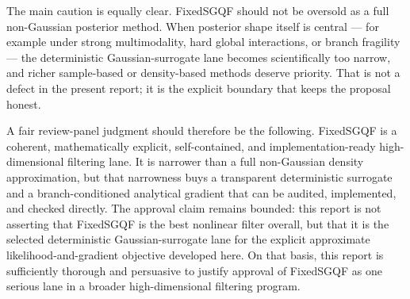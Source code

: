 \documentclass[11pt]{article}
\numberwithin{equation}{section}
\begin{document}
The main caution is equally clear.  FixedSGQF should not be oversold as a full
non-Gaussian posterior method.  When posterior shape itself is central --- for
example under strong multimodality, hard global interactions, or branch
fragility --- the deterministic Gaussian-surrogate lane becomes scientifically
too narrow, and richer sample-based or density-based methods deserve priority.
That is not a defect in the present report; it is the explicit boundary that
keeps the proposal honest.

A fair review-panel judgment should therefore be the following.  FixedSGQF is a
coherent, mathematically explicit, self-contained, and implementation-ready
high-dimensional filtering lane.  It is narrower than a full non-Gaussian
density approximation, but that narrowness buys a transparent deterministic
surrogate and a branch-conditioned analytical gradient that can be audited,
implemented, and checked directly.  The approval claim remains bounded: this
report is not asserting that FixedSGQF is the best nonlinear filter overall, but
that it is the selected deterministic Gaussian-surrogate lane for the explicit
approximate likelihood-and-gradient objective developed here.  On that basis,
this report is sufficiently thorough and persuasive to justify approval of
FixedSGQF as one serious lane in a broader high-dimensional filtering program.



\end{document}

